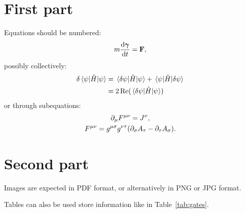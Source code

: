 \documentclass[
 reprint,
 preprintnumbers,
 nobibnotes,
 nofootinbib,
 longbibliography,
 amsmath,amssymb,
 aps,pra,
 onecolumn
]{revtex4-2}
\begin{document}
\section{First part}

Equations should be numbered:
\begin{equation}
    m \dv{\bm\gamma}{t} = \mathbf{F} ,
\end{equation}
possibly collectively:
\begin{equation}
\begin{split}
    \delta \expval{\hat{H}}{\psi} &= \mel{\delta \psi}{\hat{H}}{\psi} + \mel{\psi}{\hat{H}}{\delta \psi} \\
    &= 2 \Re(\mel{\delta \psi}{\hat{H}}{\psi})
\end{split}
\end{equation}
or through subequations:
\begin{subequations}
\begin{gather}
    \partial_\mu F^{\mu\nu} = J^\nu, \\
    F^{\mu\nu} = g^{\mu\sigma} g^{\nu\tau} \pqty{ \partial_\sigma A_\tau - \partial_\tau A_\sigma }.
\end{gather}
\end{subequations}

\section{Second part}

Images are expected in PDF format, or alternatively in PNG or JPG format.


Tables can also be used store information like in Table~\ref{tab:gates}.
\end{document}
